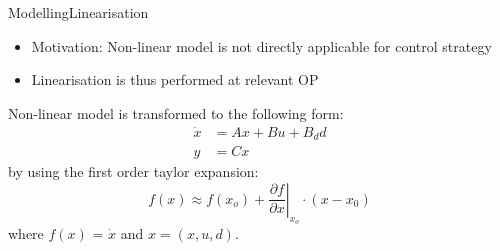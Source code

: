 
\begin{frame}{Modelling}{Linearisation}
	\begin{itemize}
		\item Motivation: Non-linear model is not directly applicable for control strategy 
		\item Linearisation is thus performed at relevant OP
	\end{itemize}
	Non-linear model is transformed to the following form:
	\begin{equation} \label{eq:state_space}
		\begin{split}
			\dot{x} & = Ax + Bu + B_dd \\
			y 		& = Cx
		\end{split}
	\end{equation}
	by using the first order taylor expansion:
	\begin{equation}
		f(x) \approx f(x_o) + \left. \dfrac{\partial f}{\partial x} \right |_{x_o} \cdot (x-x_0)		
	\end{equation}
	where $f(x)$ = $\dot{x}$ and $x = (x, u, d)$.


\end{frame}




